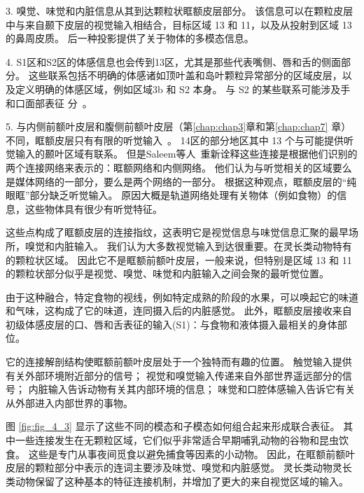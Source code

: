 3. 嗅觉、味觉和内脏信息从其到达颗粒状眶额皮层部分\cite{carmichael1994architectonic}。
该信息可以在颗粒皮层中与来自颞下皮层的视觉输入相结合，目标区域 13 和 11，以及从投射到区域 13 的鼻周皮质\cite{saleem2008complementary}。
后一种投影提供了关于物体的多模态信息\cite{murray2007orbitofrontal}。\par


4. S1区和S2区的体感信息也会传到13区，尤其是那些代表嘴侧\cite{pritchard1986projections}、唇和舌的侧面部分\cite{carmichael1994architectonic}。
这些联系包括不明确的体感诸如顶叶盖和岛叶颗粒异常部分的区域皮层\cite{saleem2008complementary}，以及定义明确的体感区域，例如区域3b 和 S2 本身。
与 S2 的某些联系可能涉及手和口面部表征 分~\cite{carmichael1994architectonic}。\par


5. 与内侧前额叶皮层和腹侧前额叶皮层（第\ref{chap:chap3}章和第\ref{chap:chap7} 章）不同，眶额皮层只有有限的听觉输入~\cite{saleem2008complementary}。
14区的部分地区其中 13 个与可能提供听觉输入的颞叶区域有联系\cite{petrides1996specialized}。
但是Saleem等人~\cite{saleem2008complementary}重新诠释这些连接是根据他们识别的两个连接网络来表示的：眶额网络和内侧网络。
他们认为与听觉相关的区域要么是媒体网络的一部分，要么是两个网络的一部分。
根据这种观点，眶额皮层的“纯眼眶”部分缺乏听觉输入。
原因大概是轨道网络处理有关物体（例如食物）的信息，这些物体具有很少有听觉特征。\par


这些点构成了眶额皮层的连接指纹，这表明它是视觉信息与味觉信息汇聚的最早场所，嗅觉和内脏输入。
我们认为大多数视觉输入到达很重要。在灵长类动物特有的颗粒状区域。
因此它不是眶额前额叶皮层，一般来说，但特别是区域 13 和 11 的颗粒状部分似乎是视觉、嗅觉、味觉和内脏输入之间会聚的最听觉位置。\par


由于这种融合，特定食物的视线，例如特定成熟的阶段的水果，可以唤起它的味道和气味，这构成了它的味道，连同摄入后的内脏感觉。
此外，眶额皮层接收来自初级体感皮层的口、唇和舌表征的输入(S1)：与食物和液体摄入最相关的身体部位\cite{carmichael1995sensory}。\par


它的连接解剖结构使眶额前额叶皮层处于一个独特而有趣的位置。
触觉输入提供有关外部环境附近部分的信号；
视觉和嗅觉输入传递来自外部世界遥远部分的信号；
内脏输入告诉动物有关其内部环境的信息；
味觉和口腔体感输入告诉它有关从外部进入内部世界的事物。\par


图 \ref{fig:fig_4_3} 显示了这些不同的模态和子模态如何组合起来形成联合表征。
其中一些连接发生在无颗粒区域，它们似乎非常适合早期哺乳动物的谷物和昆虫饮食。
这些是专门从事夜间觅食以避免捕食等因素的小动物。
因此，在眶额前额叶皮层的颗粒部分中表示的连词主要涉及味觉、嗅觉和内脏感觉。
灵长类动物灵长类动物保留了这种基本的特征连接机制，并增加了更大的来自视觉区域的输入。\par



